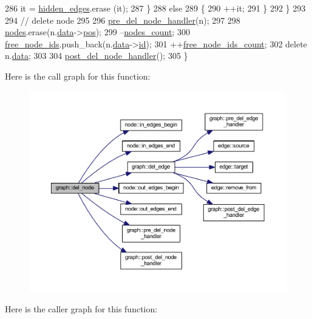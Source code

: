 \begin{DoxyCode}
286         it = \mbox{\hyperlink{classgraph_a0d3da33d047ba7cdc3dc68b5d9c84b88}{hidden\_edges}}.erase (it);
287     \}
288     \textcolor{keywordflow}{else}
289     \{ 
290         ++it;
291     \}
292     \}
293 
294     \textcolor{comment}{// delete node}
295 
296     \mbox{\hyperlink{classgraph_a64699c6cb14cdedab5e13232a8f3e754}{pre\_del\_node\_handler}}(n);
297 
298     \mbox{\hyperlink{classgraph_a4ea0592e8eb7c26c5abad24546907726}{nodes}}.erase(n.\mbox{\hyperlink{classnode_a4ae3d54ebb61be3a102bedf5b91bef75}{data}}->\mbox{\hyperlink{classnode__data_ab3deb00e39c12058e58a99a38507f344}{pos}});
299     --\mbox{\hyperlink{classgraph_a1f59223d0bcf647920963d7a661dd74a}{nodes\_count}};
300     \mbox{\hyperlink{classgraph_ae3f535853434924927a21d7725445aab}{free\_node\_ids}}.push\_back(n.\mbox{\hyperlink{classnode_a4ae3d54ebb61be3a102bedf5b91bef75}{data}}->\mbox{\hyperlink{classnode__data_ac87541ac4470e3c17df808ec9a67f6c4}{id}});
301     ++\mbox{\hyperlink{classgraph_a9480e2310fe64c3a8ad295bb3f119772}{free\_node\_ids\_count}};
302     \textcolor{keyword}{delete} n.\mbox{\hyperlink{classnode_a4ae3d54ebb61be3a102bedf5b91bef75}{data}};
303 
304     \mbox{\hyperlink{classgraph_a4e08a559e3f1007a1a16a53c9a15cb0f}{post\_del\_node\_handler}}();
305 \}
\end{DoxyCode}
Here is the call graph for this function\+:\nopagebreak
\begin{figure}[H]
\begin{center}
\leavevmode
\includegraphics[width=350pt]{classgraph_a8bdc09d5b9ac4bd26586b054d8fcbe91_cgraph}
\end{center}
\end{figure}
Here is the caller graph for this function\+:\nopagebreak
